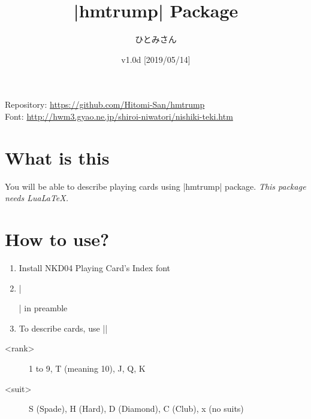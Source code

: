 \documentclass{jlreq}
\title{|hmtrump| Package}
\author{ひとみさん}
\date{v1.0d [2019/05/14]}
\begin{document}
\maketitle

\begin{center}
Repository: \url{https://github.com/Hitomi-San/hmtrump}\\
Font: \url{http://hwm3.gyao.ne.jp/shiroi-niwatori/nishiki-teki.htm}
\end{center}

\hrulefill
\tableofcontents
\pagebreak

\section{What is this}
You will be able to describe playing cards using |hmtrump| package.
\emph{This package needs LuaLaTeX.}


\section{How to use?}
\begin{enumerate}
\item Install NKD04 Playing Card's Index font
\item |\usepackage{hmtrump}| in preamble
\item To describe cards, use ||
\end{enumerate}

\begin{description}
\item[<rank>] 1 to 9, T (meaning 10), J, Q, K
\item[<suit>] S (Spade), H (Hard), D (Diamond), C (Club), x (no suits)
\end{description}
\end{document}
